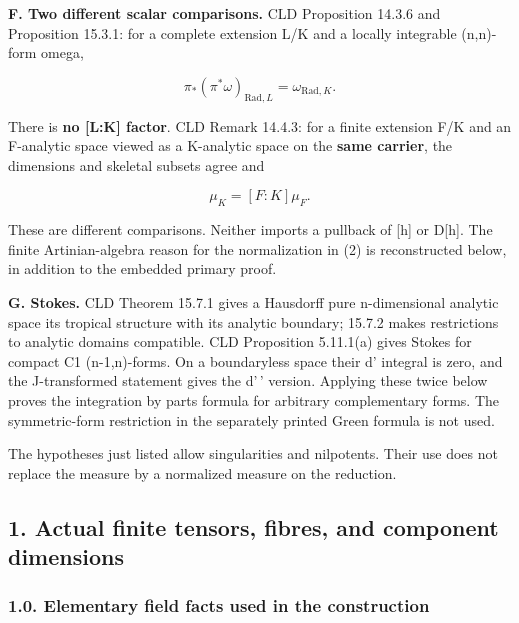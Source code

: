 \documentclass[
  10pt,
]{article}
\begin{document}
\textbf{F. Two different scalar comparisons.} CLD Proposition 14.3.6 and
Proposition 15.3.1: for a complete extension L/K and a locally
integrable (n,n)-form omega,

\[
 \pi_* (\pi^*\omega)_{\mathrm{Rad},L}
       =\omega_{\mathrm{Rad},K}.                             \tag{2}
\]

There is \textbf{no {[}L:K{]} factor}. CLD Remark 14.4.3: for a finite
extension F/K and an F-analytic space viewed as a K-analytic space on
the \textbf{same carrier}, the dimensions and skeletal subsets agree and

\[
 \mu_K=[F:K]\mu_F.                                          \tag{3}
\]

These are different comparisons. Neither imports a pullback of {[}h{]}
or D{[}h{]}. The finite Artinian-algebra reason for the normalization in
(2) is reconstructed below, in addition to the embedded primary proof.

\textbf{G. Stokes.} CLD Theorem 15.7.1 gives a Hausdorff pure
n-dimensional analytic space its tropical structure with its analytic
boundary; 15.7.2 makes restrictions to analytic domains compatible. CLD
Proposition 5.11.1(a) gives Stokes for compact C1 (n-1,n)-forms. On a
boundaryless space their d' integral is zero, and the J-transformed
statement gives the d'\,' version. Applying these twice below proves the
integration by parts formula for arbitrary complementary forms. The
symmetric-form restriction in the separately printed Green formula is
not used.

The hypotheses just listed allow singularities and nilpotents. Their use
does not replace the measure by a normalized measure on the reduction.

\subsection{1. Actual finite tensors, fibres, and component
dimensions}\label{actual-finite-tensors-fibres-and-component-dimensions}

\subsubsection{1.0. Elementary field facts used in the
construction}\label{elementary-field-facts-used-in-the-construction}
\end{document}
